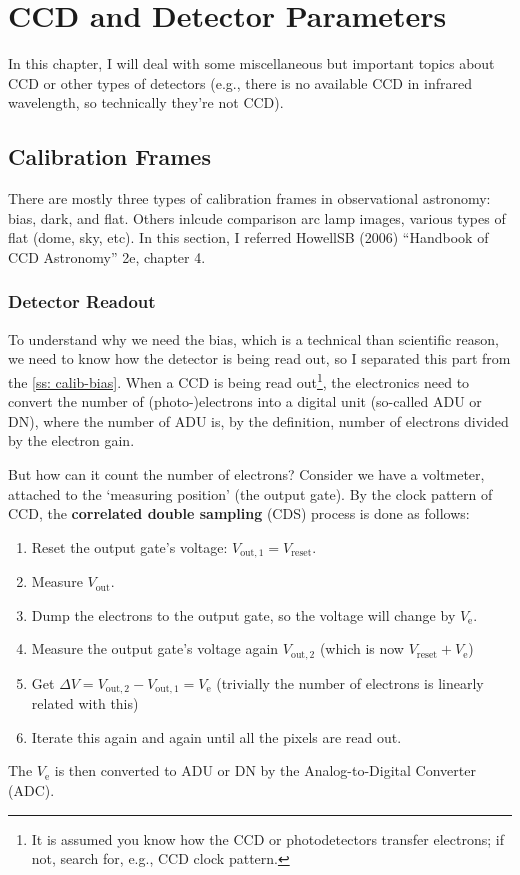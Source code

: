 \chapter{CCD and Detector Parameters}
In this chapter, I will deal with some miscellaneous but important topics about CCD or other types of detectors (e.g., there is no available CCD in infrared wavelength, so technically they're not CCD). 

\section{Calibration Frames}
There are mostly three types of calibration frames in observational astronomy: bias, dark, and flat. Others inlcude comparison arc lamp images, various types of flat (dome, sky, etc). In this section, I referred HowellSB (2006) ``Handbook of CCD Astronomy'' 2e, chapter 4. 

\subsection{Detector Readout}
To understand why we need the bias, which is a technical than scientific reason, we need to know how the detector is being read out, so I separated this part from the \cref{ss: calib-bias}. When a CCD is being read out\footnote{It is assumed you know how the CCD or photodetectors transfer electrons; if not, search for, e.g., CCD clock pattern.}, the electronics need to convert the number of (photo-)electrons into a digital unit (so-called ADU or DN), where the number of ADU is, by the definition, number of electrons divided by the electron gain. 

But how can it count the number of electrons? Consider we have a voltmeter, attached to the `measuring position' (the output gate). By the clock pattern of CCD, the \textbf{correlated double sampling} (CDS) process is done as follows:
\begin{enumerate}
  \item Reset the output gate's voltage: $ V_\mathrm{out, 1} = V_\mathrm{reset} $.
  \item Measure $ V_\mathrm{out} $.
  \item Dump the electrons to the output gate, so the voltage will change by $ V_\mathrm{e} $.
  \item Measure the output gate's voltage again $ V_\mathrm{out, 2} $ (which is now $ V_\mathrm{reset} + V_\mathrm{e} $)
  \item Get $ \Delta V = V_\mathrm{out, 2} - V_\mathrm{out, 1} = V_\mathrm{e}$ (trivially the number of electrons is linearly related with this)
  \item Iterate this again and again until all the pixels are read out.
\end{enumerate}
The $ V_\mathrm{e} $ is then converted to ADU or DN by the Analog-to-Digital Converter (ADC). 

